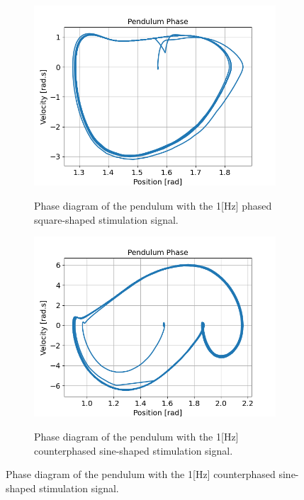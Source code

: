 \documentclass{cmc}
\begin{document}
\begin{figure}[H]
  \centering
  \begin{subfigure}[b]{0.48\textwidth}
    { \centering
      \includegraphics[width=0.99\textwidth]{figures/2b_sine_phased.png} }
    \caption{Phase diagram of the pendulum with the 1[Hz] phased square-shaped stimulation signal.}
    \label{fig:2b_sine_signal}
  \end{subfigure}
  \begin{subfigure}[b]{0.48\textwidth}
    { \centering
      \includegraphics[width=0.99\textwidth]{figures/2b_sine_counterphased.png} }
    \caption{Phase diagram of the pendulum with the 1[Hz] counterphased sine-shaped stimulation signal.}
    \label{fig:2b_sine_phase}
  \end{subfigure}
  

\end{figure}
\end{document}
